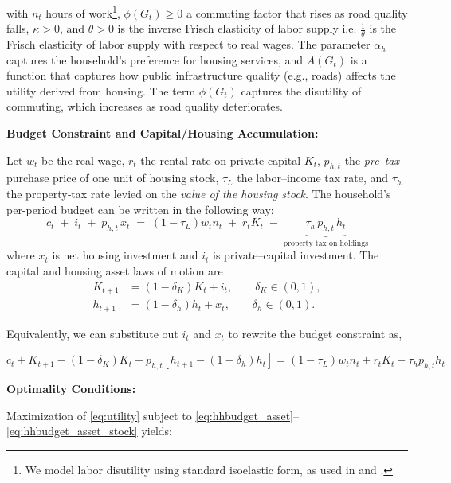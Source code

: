 with $n_t$ hours of work\footnote{We model labor disutility using standard isoelastic form, as used in \cite{king1988} and \cite{chetty2011micro}.}, $\phi(G_t)\ge0$ a commuting factor that rises as road quality falls, $\kappa>0$, and $\theta>0$ is the inverse Frisch elasticity of labor supply i.e. $\frac{1}{\theta}$ is the Frisch elasticity of labor supply with respect to real wages. The parameter $\alpha_h$ captures the household’s preference for housing services, and $A(G_t)$ is a function that captures how public infrastructure quality (e.g., roads) affects the utility derived from housing. The term $\phi(G_t)$ captures the disutility of commuting, which increases as road quality deteriorates.

\vskip 0.3cm

{\bf Budget Constraint and Capital/Housing Accumulation:}
\vskip 0.3cm

Let $w_t$ be the real wage, $r_t$ the rental rate on private capital $K_t$, $p_{h,t}$ the \emph{pre–tax} purchase price of one unit of housing stock, $\tau_L$ the labor–income tax rate, and $\tau_h$ the property‐tax rate levied on the \emph{value of the housing stock}. The household’s per-period budget can be written in the following way:
\begin{equation}
c_t \;+\; i_t \;+\; p_{h,t}\,x_t \;=\; (1-\tau_L)w_t n_t \;+\; r_t K_t \;-\; \underbrace{\tau_h\,p_{h,t}\,h_t}_{\text{property tax on holdings}}
\label{eq:hhbudget_asset}
\end{equation}
where $x_t$ is net housing investment and $i_t$ is private–capital investment. The capital and housing asset laws of motion are
\begin{align}
K_{t+1}&=(1-\delta_K)K_t + i_t,\qquad \delta_K\in(0,1),\\
h_{t+1}&=(1-\delta_h)h_t + x_t,\qquad \delta_h\in(0,1).
\end{align}

Equivalently, we can substitute out $i_t$ and $x_t$ to rewrite the budget constraint as,

\begin{equation}
c_t + K_{t+1} - (1-\delta_K)K_t + p_{h,t}[h_{t+1} - (1-\delta_h)h_t] = (1-\tau_L)w_t n_t + r_t K_t - \tau_h p_{h,t}h_t
\label{eq:hhbudget_asset_stock}
\end{equation}

{\bf Optimality Conditions:}
\vskip 0.3cm

Maximization of \eqref{eq:utility} subject to \eqref{eq:hhbudget_asset}–\eqref{eq:hhbudget_asset_stock} yields:


